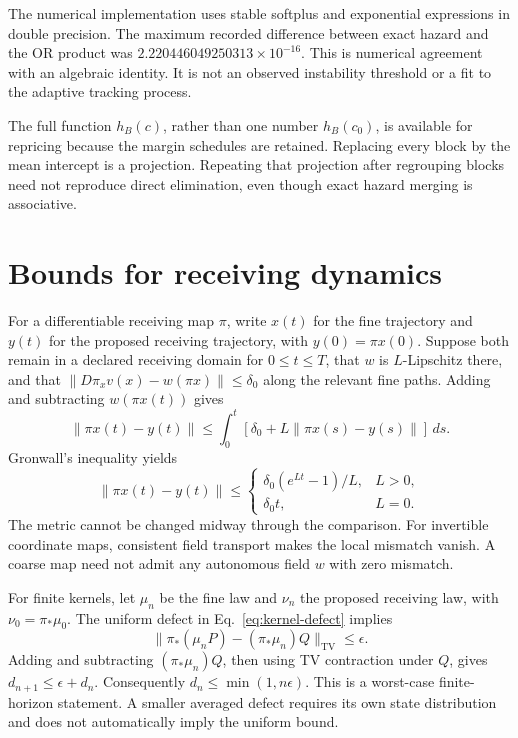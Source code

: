 The numerical implementation uses stable softplus and exponential expressions in double precision. The maximum recorded difference between exact hazard and the OR product was \(2.220446049250313\times10^{-16}\). This is numerical agreement with an algebraic identity. It is not an observed instability threshold or a fit to the adaptive tracking process.

The full function \(h_B(c)\), rather than one number \(h_B(c_0)\), is available for repricing because the margin schedules are retained. Replacing every block by the mean intercept is a projection. Repeating that projection after regrouping blocks need not reproduce direct elimination, even though exact hazard merging is associative.

\section{Bounds for receiving dynamics}
\label{app:maps}

For a differentiable receiving map \(\pi\), write \(x(t)\) for the fine trajectory and \(y(t)\) for the proposed receiving trajectory, with \(y(0)=\pi x(0)\). Suppose both remain in a declared receiving domain for \(0\leq t\leq T\), that \(w\) is \(L\)-Lipschitz there, and that
\(\|D\pi_xv(x)-w(\pi x)\|\leq\delta_0\) along the relevant fine paths. Adding and subtracting \(w(\pi x(t))\) gives
\[
 \|\pi x(t)-y(t)\|
 \leq\int_0^t[\delta_0+L\|\pi x(s)-y(s)\|]\,ds .
\]
Gronwall's inequality yields
\[
 \|\pi x(t)-y(t)\|\leq
 \begin{cases}
 \delta_0(e^{Lt}-1)/L,&L>0,\\
 \delta_0t,&L=0 .
 \end{cases}
\]
The metric cannot be changed midway through the comparison. For invertible coordinate maps, consistent field transport makes the local mismatch vanish. A coarse map need not admit any autonomous field \(w\) with zero mismatch.

For finite kernels, let \(\mu_n\) be the fine law and \(\nu_n\) the proposed receiving law, with \(\nu_0=\pi_*\mu_0\). The uniform defect in Eq.~\eqref{eq:kernel-defect} implies
\[
 \|\pi_*(\mu_nP)-(\pi_*\mu_n)Q\|_{\mathrm{TV}}\leq\epsilon .
\]
Adding and subtracting \((\pi_*\mu_n)Q\), then using TV contraction under \(Q\), gives
\(d_{n+1}\leq\epsilon+d_n\).
Consequently \(d_n\leq\min(1,n\epsilon)\). This is a worst-case finite-horizon statement. A smaller averaged defect requires its own state distribution and does not automatically imply the uniform bound.

